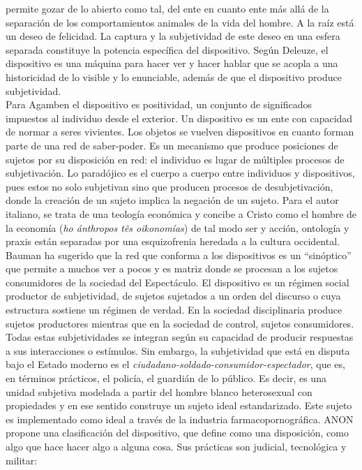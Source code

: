 \documentclass[
]{article}
\begin{document}
permite gozar de lo abierto como tal, del ente en cuanto ente más allá
de la separación de los comportamientos animales de la vida del hombre.
A la raíz está un deseo de felicidad. La captura y la subjetividad de
este deseo en una esfera separada constituye la potencia específica del
dispositivo. Según Deleuze, el dispositivo es una máquina para hacer ver
y hacer hablar que se acopla a una historicidad de lo visible y lo
enunciable, además de que el dispositivo produce subjetividad.\\
Para Agamben el dispositivo es positividad, un conjunto de significados
impuestos al individuo desde el exterior. Un dispositivo es un ente con
capacidad de normar a seres vivientes. Los objetos se vuelven
dispositivos en cuanto forman parte de una red de saber-poder. Es un
mecanismo que produce posiciones de sujetos por su disposición en red:
el individuo es lugar de múltiples procesos de subjetivación. Lo
paradójico es el cuerpo a cuerpo entre individuos y dispositivos, pues
estos no solo subjetivan sino que producen procesos de desubjetivación,
donde la creación de un sujeto implica la negación de un sujeto. Para el
autor italiano, se trata de una teología económica y concibe a Cristo
como el hombre de la economía (\emph{ho ánthropos tês oikonomías}) de
tal modo ser y acción, ontología y praxis están separadas por una
esquizofrenia heredada a la cultura occidental. Bauman ha sugerido que
la red que conforma a los dispositivos es un ``sinóptico'' que permite a
muchos ver a pocos y es matriz donde se procesan a los sujetos
consumidores de la sociedad del Espectáculo. El dispositivo es un
régimen social productor de subjetividad, de sujetos sujetados a un
orden del discurso o cuya estructura sostiene un régimen de verdad. En
la sociedad disciplinaria produce sujetos productores mientras que en la
sociedad de control, sujetos consumidores. Todas estas subjetividades se
integran según su capacidad de producir respuestas a sus interacciones o
estímulos. Sin embargo, la subjetividad que está en disputa bajo el
Estado moderno es el \emph{ciudadano-soldado-consumidor-espectador}, que
es, en términos prácticos, el policía, el guardián de lo público. Es
decir, es una unidad subjetiva modelada a partir del hombre blanco
heterosexual con propiedades y en ese sentido construye un sujeto ideal
estandarizado. Este sujeto es implementado como ideal a través de la
industria farmacopornográfica. ANON propone una clasificación del
dispositivo, que define como una disposición, como algo que hace hacer
algo a alguna cosa. Sus prácticas son judicial, tecnológica y militar:
\end{document}
